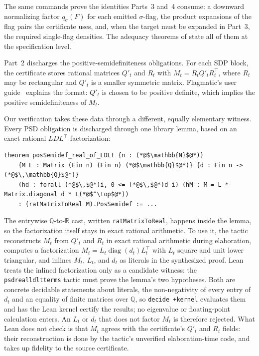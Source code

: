 \documentclass[acmsmall,screen=true,acmthm=false]{acmart}
\newcommand{\boldparagraph}[1]{\noindentparagraph{\textnormal{\textbf{#1}}}}
\DeclareRobustCommand{\lean}[1]{{\def\_{\textunderscore\allowbreak}\texttt{#1}}}
\begin{document}
The same commands prove the identities Parts~3 and~4 consume: a downward
normalizing factor $q_\sigma(F)$ for each emitted $\sigma$-flag, the product
expansions of the flag pairs the certificate uses, and, when the target must be
expanded in Part~3, the required single-flag densities.  The adequacy theorems
of  state all of them at the specification level.

\boldparagraph{Certifying the matrices (Part~2).}
Part~2 discharges the
positive-semidefiniteness obligations.  For each SDP block, the certificate
stores rational matrices $Q'_t$ and $R_t$ with
$M_t=R_tQ'_tR_t^\top$, where $R_t$ may be rectangular and $Q'_t$ is a smaller
symmetric matrix. Flagmatic's user guide~\cite{vaughan2012flagmaticguide}
explains the format: $Q'_t$ is
chosen to be positive definite, which implies the positive semidefiniteness of $M_t$.

Our verification takes these data through a different, equally elementary
witness.  Every PSD obligation is discharged through one library lemma, based
on an exact rational $LDL^\top$ factorization:
\begin{lstlisting}
theorem posSemidef_real_of_LDLt {n : (*@$\mathbb{N}$@*)}
    {M L : Matrix (Fin n) (Fin n) (*@$\mathbb{Q}$@*)} {d : Fin n -> (*@$\,\mathbb{Q}$@*)}
    (hd : forall (*@$\,$@*)i, 0 <= (*@$\,$@*)d i) (hM : M = L * Matrix.diagonal d * L(*@$^\top$@*))
    : (ratMatrixToReal M).PosSemidef := ...
\end{lstlisting}
The entrywise $\mathbb{Q}$-to-$\mathbb{R}$ cast, written
\lean{ratMatrixToReal}, happens inside the lemma, so the factorization itself
stays in exact rational arithmetic.  To use it, the tactic reconstructs $M_t$ from $Q'_t$ and $R_t$ in
exact rational arithmetic during elaboration, computes a factorization
$M_t=L_t\operatorname{diag}(d_t)L_t^\top$ with $L_t$ square and unit lower
triangular, and inlines $M_t$, $L_t$, and $d_t$ as literals in the
synthesized proof.  Lean treats the inlined factorization only as a candidate
witness: the \lean{psd\_real\_ldlt\_terms} tactic must prove the lemma's two
hypotheses.  Both are concrete decidable statements about literals, the
non-negativity of every entry of $d_t$ and an equality of finite matrices
over $\mathbb{Q}$, so \lean{decide +kernel} evaluates them and has the Lean
kernel certify the results; no eigenvalue or floating-point calculation
enters.  An $L_t$ or $d_t$ that does not factor $M_t$ is
therefore rejected.  What Lean does not check is that $M_t$ agrees with
the certificate's $Q'_t$ and $R_t$ fields: their reconstruction is done by the
tactic's unverified elaboration-time code, and 
takes up fidelity to the source certificate.
\end{document}
